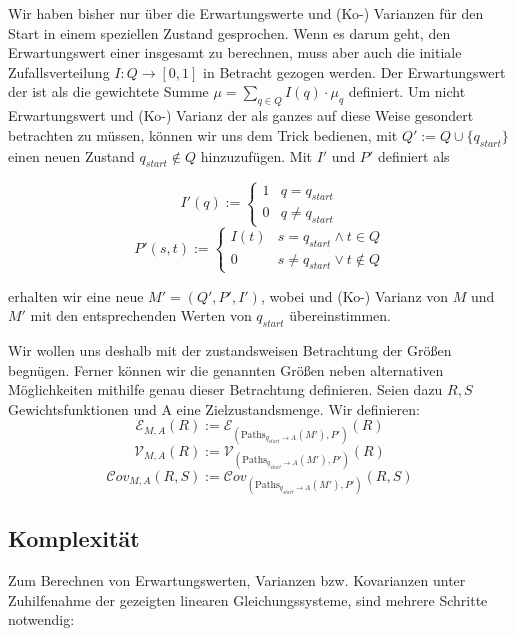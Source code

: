 \documentclass[a4paper]{article}
\theoremstyle{nonumberplain}
\begin{document}
Wir haben bisher nur über die Erwartungswerte und (Ko-) Varianzen für den Start in einem speziellen Zustand gesprochen. Wenn es darum geht, den Erwartungswert einer \mc{} \mcex{} insgesamt zu berechnen, muss aber auch die initiale Zufallsverteilung $I : Q \to [0,1]$ in Betracht gezogen werden. Der Erwartungswert der \mc{} ist als die gewichtete Summe $\mu = \sum_{q\in Q}{I(q) \cdot \mu_q}$ definiert. Um nicht Erwartungswert und (Ko-) Varianz der \mc{} als ganzes auf diese Weise gesondert betrachten zu müssen, können wir uns dem Trick bedienen, mit $Q' := Q \cup \{q_{start}\}$ einen neuen Zustand $q_{start} \notin Q$ hinzuzufügen. Mit $I'$ und $P'$ definiert als
\begin{multicols}{2}
\noindent
\begin{equation*}
	I'(q) := \begin{cases}
		1 & q = q_{start}\\
		0 & q \neq q_{start}
		
	\end{cases}
\end{equation*}
\begin{equation*}
	P'(s, t)  := \begin{cases}
	I(t) & s = q_{start} \land t \in Q \\
	0 & s \neq q_{start} \lor t \notin Q
	\end{cases}
\end{equation*}
\end{multicols}
erhalten wir eine neue \mc{} $M'=(Q',P',I')$, wobei \expect{} und (Ko-) Varianz von $M$ und $M'$ mit den entsprechenden Werten von $q_{start}$ übereinstimmen.

Wir wollen uns deshalb mit der zustandsweisen Betrachtung der Größen begnügen. Ferner können wir die genannten Größen neben alternativen Mög\-lich\-keit\-en mithilfe genau dieser Betrachtung definieren. Seien dazu $R, S$ Gewichtsfunktionen und A eine Zielzustandsmenge. Wir definieren:
	\[\mathcal{E}_{M,A}(R) := \mathcal{E}_{(\mathrm{Paths}_{q_{start} \rightarrow A}(M'), P')}(R)\]
	\[\mathcal{V}_{M,A}(R) := \mathcal{V}_{(\mathrm{Paths}_{q_{start} \rightarrow A}(M'), P')}(R)\]
	\[\mathcal{C}\mathit{ov}_{M,A}(R,S) := \mathcal{C}\mathit{ov}_{(\mathrm{Paths}_{q_{start} \rightarrow A}(M'), P')}(R,S)\]
	
\subsection{Komplexität}

Zum Berechnen von Erwartungswerten, Varianzen bzw. Kovarianzen unter Zuhilfenahme der gezeigten linearen Gleichungssysteme, sind mehrere Schritte notwendig:
\end{document}

